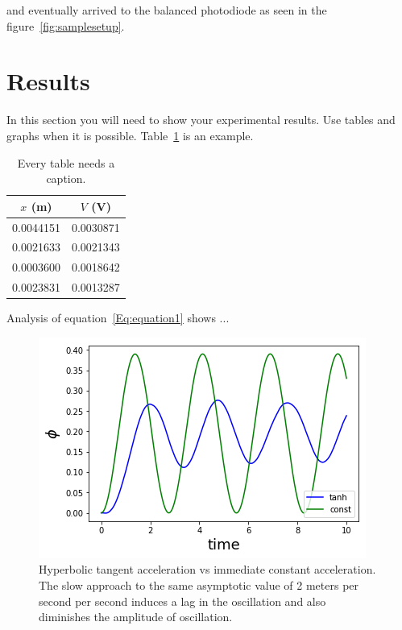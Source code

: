 \documentclass[letterpaper,12pt]{article}
\begin{document}
and eventually arrived to the
balanced photodiode as seen in the figure~\ref{fig:samplesetup}.


\section{Results}

In this section you will need to show your experimental results. Use tables and
graphs when it is possible. Table~\ref{tbl:bins} is an example.

\begin{table}[ht]
\begin{center}
\caption{Every table needs a caption.}
\label{tbl:bins} %
\begin{tabular}{|cc|} 
\hline
\multicolumn{1}{|c}{$x$ (m)} & \multicolumn{1}{c|}{$V$ (V)} \\
\hline
0.0044151 &   0.0030871 \\
0.0021633 &   0.0021343 \\
0.0003600 &   0.0018642 \\
0.0023831 &   0.0013287 \\
\hline
\end{tabular}
\end{center}
\end{table}

Analysis of equation~\ref{Eq:equation1} shows ...

\blindtext

\begin{figure}
    \centering
    \includegraphics[width=.7\textwidth]{tanh_vs_const_1.png}
    \caption{Hyperbolic tangent acceleration vs immediate constant acceleration. The slow approach to the same asymptotic value of 2 meters per second per second induces a lag in the oscillation and also diminishes the amplitude of oscillation.}
\end{figure}
\end{document}
